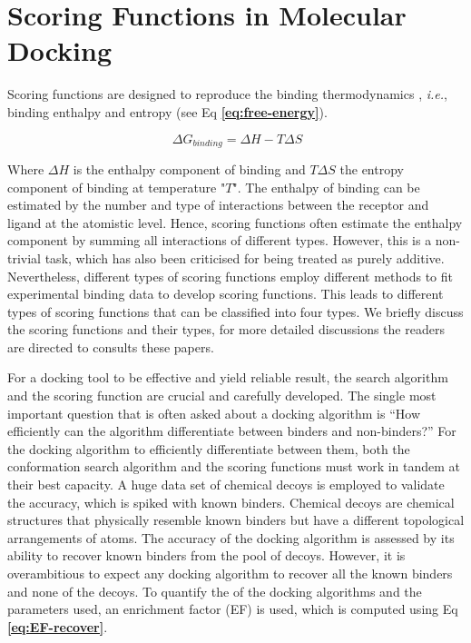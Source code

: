\chapter*{Scoring Functions in Molecular Docking}
Scoring functions are designed to reproduce the binding thermodynamics \cite{bib2, bib3}, \textit{i.e.}, binding enthalpy and entropy (see Eq \textbf{\ref{eq:free-energy}}).

\begin{equation} 
    \label{eq:free-energy}
    \   {\Delta}G_{binding} = {\Delta}H - T{\Delta}S   
\end{equation}

Where  \({\Delta}H\) is the enthalpy component of binding and \(T{\Delta}S\) the entropy component of binding at temperature "$T$".
The enthalpy of binding can be estimated by the number and type of interactions between the receptor and ligand at the atomistic level. Hence, scoring functions often estimate the enthalpy component by summing all interactions of different types. However, this is a non-trivial task, which has also been criticised for being treated as purely additive\cite{bib61, bib62}. Nevertheless, different types of scoring functions employ different methods to fit experimental binding data to develop scoring functions. This leads to different types of scoring functions that can be classified into four types. We briefly discuss the scoring functions and their types, for more detailed discussions the readers are directed to consults these papers\cite{bib51, bib52}.

For a docking tool to be effective and yield reliable result, the search algorithm and the scoring function are crucial and carefully developed.  The single most important question that is often asked about a docking algorithm is “How efficiently can the algorithm differentiate between binders and non-binders?” For the docking algorithm to efficiently differentiate between them, both the conformation search algorithm and the scoring functions must work in tandem at their best capacity. A huge data set of chemical decoys is employed to validate the accuracy, which is spiked with known binders. Chemical decoys are chemical structures that physically resemble known binders but have a different topological arrangements of atoms. The accuracy of the docking algorithm is assessed by its ability to recover known binders from the pool of decoys. However, it is overambitious to expect any docking algorithm to recover all the known binders and none of the decoys. To quantify the {\color{red}{accuracy}} of the docking algorithms and the parameters used, an enrichment factor (EF)\cite{bib4} is used, which is computed using Eq \textbf{\ref{eq:EF-recover}}.

